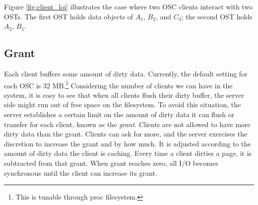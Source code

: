 Figure \ref{fig:client_loi} illustrates the case where two OSC clients interact
with two OSTs.  The first OST holds data objects of $A_1$, $B_2$, and $C_3$;
the second OST holds $A_2$, $B_1$.

\subsection{Grant}

Each client buffers some amount of dirty data. Currently, the default setting
for each OSC is 32 MB.\footnote{This is tunable through proc filesystem.}
Considering the number of clients we can have in the system, it is easy to see
that when all clients flush their dirty buffer, the server side
might run out of free space on the filesystem.  To avoid this situation,
the server establishes a certain limit on the amount of dirty data it can
flush or transfer for each client, known as the \textit{grant}. Clients are not
allowed to have more dirty data than the grant. Clients can ask for more, and the
server exercises the discretion to increase the grant and by how much.  It is adjusted
according to the amount of dirty data the client is caching. Every time a client
dirties a page, it is subtracted from that grant. When grant reaches zero, all I/O
becomes synchronous until the client can increase its grant.
